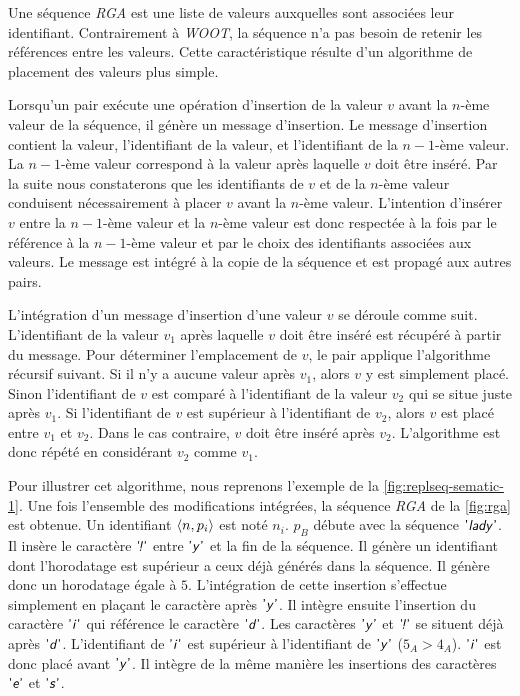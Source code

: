 Une séquence \emph{RGA} est une liste de valeurs auxquelles sont associées leur identifiant.
Contrairement à \emph{WOOT}, la séquence n'a pas besoin de retenir les références entre les valeurs.
Cette caractéristique résulte d'un algorithme de placement des valeurs plus simple.

Lorsqu'un pair exécute une opération d'insertion de la valeur $v$ avant la $n$-ème valeur de la séquence, il génère un message d'insertion.
Le message d'insertion contient la valeur, l'identifiant de la valeur, et l'identifiant de la $n-1$-ème valeur.
La $n-1$-ème valeur correspond à la valeur après laquelle $v$ doit être inséré.
Par la suite nous constaterons que les identifiants de $v$ et de la $n$-ème valeur conduisent nécessairement à placer $v$ avant la $n$-ème valeur.
L'intention d'insérer $v$ entre la $n-1$-ème valeur et la $n$-ème valeur est donc respectée à la fois par le référence à la $n-1$-ème valeur et par le choix des identifiants associées aux valeurs.
Le message est intégré à la copie de la séquence et est propagé aux autres pairs.

L'intégration d'un message d'insertion d'une valeur $v$ se déroule comme suit.
L'identifiant de la valeur $v_1$ après laquelle $v$ doit être inséré est récupéré à partir du message.
Pour déterminer l'emplacement de $v$, le pair applique l'algorithme récursif suivant.
Si il n'y a aucune valeur après $v_1$, alors $v$ y est simplement placé.
Sinon l'identifiant de $v$ est comparé à l'identifiant de la valeur $v_2$ qui se situe juste après $v_1$.
Si l'identifiant de $v$ est supérieur à l'identifiant de $v_2$, alors $v$ est placé entre $v_1$ et $v_2$.
Dans le cas contraire, $v$ doit être inséré après $v_2$.
L'algorithme est donc répété en considérant $v_2$ comme $v_1$.

Pour illustrer cet algorithme, nous reprenons l'exemple de la \autoref{fig:replseq-sematic-1}.
Une fois l'ensemble des modifications intégrées, la séquence \emph{RGA} de la \autoref{fig:rga} est obtenue.
Un identifiant $\tuple*{n, p_i}$ est noté $n_i$.
$p_B$ débute avec la séquence $\textsf{'\textit{lady}'}$.
Il insère le caractère $\textsf{'\textit{\negthinspace!}'}$ entre $\textsf{'\textit{y}'}$ et la fin de la séquence.
Il génère un identifiant dont l'horodatage est supérieur a ceux déjà générés dans la séquence.
Il génère donc un horodatage égale à $5$.
L'intégration de cette insertion s'effectue simplement en plaçant le caractère après $\textsf{'\textit{y}'}$.
Il intègre ensuite l'insertion du caractère $\textsf{'\textit{i}'}$ qui référence le caractère $\textsf{'\textit{d}'}$.
Les caractères $\textsf{'\textit{y}'}$ et $\textsf{'\textit{\negthinspace!}'}$ se situent déjà après $\textsf{'\textit{d}'}$.
L'identifiant de $\textsf{'\textit{i}'}$ est supérieur à l'identifiant de $\textsf{'\textit{y}'}$ ($5_A > 4_A$).
$\textsf{'\textit{i}'}$ est donc placé avant $\textsf{'\textit{y}'}$.
Il intègre de la même manière les insertions des caractères $\textsf{'\textit{e}'}$ et $\textsf{'\textit{s}'}$.


